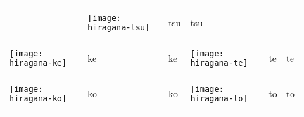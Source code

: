 \documentclass[a4paper,12pt]{extarticle}
\begin{document}
\begin{longtable}{|lll|lll|}
	                                   &
	\begin{minipage}{0.2\textwidth}
		\centerline{
			\texttt{[image: hiragana-tsu]}
		}
	\end{minipage}
	                                   &
	\begin{CJK}{UTF8}{min}tsu\end{CJK}
	                                   &
	tsu
	\\
	\begin{minipage}{0.2\textwidth}
		\centerline{
			\texttt{[image: hiragana-ke]}
		}
	\end{minipage}
	                                   &
	\begin{CJK}{UTF8}{min}ke\end{CJK}
	                                   &
	ke

	                                   &
	\begin{minipage}{0.2\textwidth}
		\centerline{
			\texttt{[image: hiragana-te]}
		}
	\end{minipage}
	                                   &
	\begin{CJK}{UTF8}{min}te\end{CJK}
	                                   &
	te
	\\
	\begin{minipage}{0.2\textwidth}
		\centerline{
			\texttt{[image: hiragana-ko]}
		}
	\end{minipage}
	                                   &
	\begin{CJK}{UTF8}{min}ko\end{CJK}
	                                   &
	ko

	                                   &
	\begin{minipage}{0.2\textwidth}
		\centerline{
			\texttt{[image: hiragana-to]}
		}
	\end{minipage}
	                                   &
	\begin{CJK}{UTF8}{min}to\end{CJK}
	                                   &
	to
	\\
\end{longtable}
\end{document}
